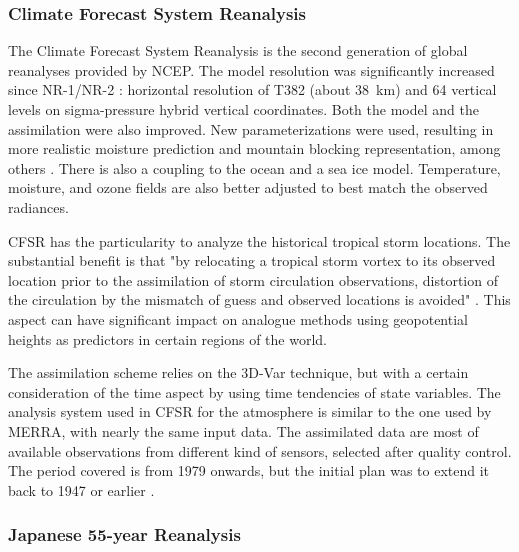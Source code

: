 \documentclass{ametsoc}
\begin{document}
\subsubsection{Climate Forecast System Reanalysis}

The Climate Forecast System Reanalysis \citep[CFSR, ][]{Saha2010a} is the second generation of global reanalyses provided by NCEP. The model resolution was significantly increased since NR-1/NR-2 : horizontal resolution of T382 (about 38~km) and 64 vertical levels on sigma-pressure hybrid vertical coordinates. Both the model and the assimilation were also improved. New parameterizations were used, resulting in more realistic moisture prediction and mountain blocking representation, among others \citep{Saha2010a}. There is also a coupling to the ocean and a sea ice model. Temperature, moisture, and ozone fields are also better adjusted to best match the observed radiances.

CFSR has the particularity to analyze the historical tropical storm locations. The substantial benefit is that "by relocating a tropical storm vortex to its observed location prior to the assimilation of storm circulation observations, distortion of the circulation by the mismatch of guess and observed locations is avoided" \citep{Saha2010a}. This aspect can have significant impact on analogue methods using geopotential heights as predictors in certain regions of the world.

The assimilation scheme relies on the 3D-Var technique, but with a certain consideration of the time aspect by using time tendencies of state variables. The analysis system used in CFSR for the atmosphere is similar to the one used by MERRA, with nearly the same input data. The assimilated data are most of available observations from different kind of sensors, selected after quality control. The period covered is from 1979 onwards, but the initial plan was to extend it back to 1947 or earlier \citep{Saha2010a}.


\subsubsection{Japanese 55-year Reanalysis}
\end{document}
